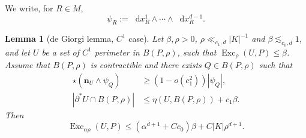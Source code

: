 \documentclass[reqno,10pt]{amsart}
\DeclareMathOperator{\Exc}{Exc}
\newcommand*\dif{\mathop{}\!\mathrm{d}}
\newcommand{\normal}{\mathbf n}
\newtheorem{lemma}[theorem]{Lemma}
\theoremstyle{definition}
\numberwithin{equation}{section}
\begin{document}
We write, for $R \in M$,
$$\psi_R := \dif x^1_R \wedge \cdots \wedge \dif x^{d - 1}_R.$$

\begin{lemma}[de Giorgi lemma, $C^1$ case]\label{Miranda44}
Let $\beta, \rho > 0$, $\rho \ll_{c_1, d} |K|^{-1}$ and $\beta \lesssim_{c_0, d} 1$, and let $U$ be a set of $C^1$ perimeter in $B(P, \rho)$, such that $\Exc_\rho (U, P) \leq \beta$. Assume that $B(P, \rho)$ is contractible and there exists $Q \in B(P, \rho)$ such that
\begin{align}
\star(\normal_U \wedge \psi_Q) &\geq (1 - o(c_1^2)) |\psi_Q|, \label{Miranda44 normal hyp} \\
|\partial^* U \cap B(P, \rho)| &\leq \eta(U, B(P, \rho)) + c_1 \beta. \label{Miranda44 minimality hyp}
\end{align}
Then
\begin{equation}\label{Miranda44 concl}
\Exc_{\alpha \rho} (U, P) \leq (\alpha^{d + 1} + Cc_0) \beta + C|K|\rho^{d + 1}.
\end{equation}
\end{lemma}
\end{document}
